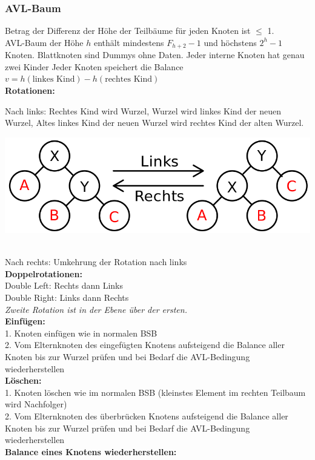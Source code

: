 \documentclass[fs, footer]{latex4ei}
\begin{document}
\begin{multicols*}{4}
{{\subsubsection{AVL-Baum}
Betrag der Differenz der Höhe der Teilbäume für jeden Knoten ist $\leq$ 1.\\
AVL-Baum der Höhe $h$ enthält mindestens $F_{h+2}-1$ und höchstens $2^h - 1$ Knoten.
Blattknoten sind Dummys ohne Daten. Jeder interne Knoten hat genau zwei Kinder
Jeder Knoten speichert die Balance $v = h(\text{linkes Kind}) - h(\text{rechtes Kind})$ \\
\textbf{Rotationen:}\\
\parbox{.5\linewidth}{
Nach links: Rechtes Kind wird Wurzel, Wurzel wird linkes Kind der neuen Wurzel, Altes linkes Kind der neuen Wurzel wird rechtes Kind der alten Wurzel.}\parbox{.5\linewidth}{\vspace{-.3cm}
\includegraphics[width=\linewidth]{img/avl-rotate}}\\
Nach rechts: Umkehrung der Rotation nach links\\
\textbf{Doppelrotationen:}\\
Double Left: Rechts dann Links\\
Double Right: Links dann Rechts\\
\textit{Zweite Rotation ist in der Ebene über der ersten.}\\
\textbf{Einfügen:}\\
1. Knoten einfügen wie in normalen BSB\\
2. Vom Elternknoten des eingefügten Knotens aufsteigend die Balance aller Knoten bis zur Wurzel prüfen und bei Bedarf die AVL-Bedingung wiederherstellen\\
\textbf{Löschen:}\\
1. Knoten löschen wie im normalen BSB (kleinstes Element im rechten Teilbaum wird Nachfolger)\\
2. Vom Elternknoten des überbrücken Knotens aufsteigend die Balance aller Knoten bis zur Wurzel prüfen und bei Bedarf die AVL-Bedingung wiederherstellen\\
\textbf{Balance eines Knotens wiederherstellen:}\\
}}
\end{multicols*}
\end{document}
